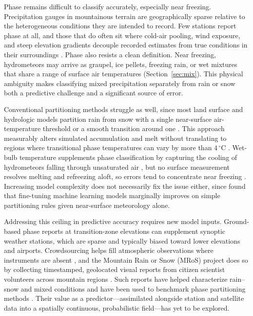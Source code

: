 \documentclass[twocol]{ametsocV6.1} %
\newcommand{\degC}[1]{\ensuremath{#1\,^{\circ}\mathrm{C}}}
\begin{document}
Phase remains difficult to classify accurately, especially near freezing.
Precipitation gauges in mountainous terrain are geographically sparse
relative to the heterogeneous conditions they are intended to record.
Few stations report phase at all, and those that do often sit where
cold-air pooling, wind exposure, and steep elevation gradients decouple
recorded estimates from true conditions in their surroundings
\citep{lundquist2008rain, minder2011, wayand2016}. Phase also resists a
clean definition. Near freezing, hydrometeors may arrive as graupel, ice
pellets, freezing rain, or wet mixtures that share a range of surface air
temperatures (Section~\ref{sec:mix}). This physical ambiguity makes
classifying mixed precipitation separately from rain or snow both a
predictive challenge and a significant source of error.

Conventional partitioning methods struggle as well, since most land
surface and hydrologic models partition rain from snow with a
single near-surface air-temperature threshold or a smooth transition
around one \citep{ding2014, dai2008}. This approach measurably alters simulated
accumulation and melt \citep{jennings2019sensitivity} without translating
to regions where transitional phase temperatures can vary by more than
\degC{4} \citep{jennings2018spatial}. Wet-bulb temperature supplements
phase classification by capturing the cooling of hydrometeors falling
through unsaturated air \citep{harder2013, sims2015, wang2019}, but no
surface measurement resolves melting and refreezing aloft, so errors tend to
concentrate near freezing \citep{feiccabrino2015}. Increasing model
complexity does not necessarily fix the issue either, since
\citet{jennings2025} found that fine-tuning machine learning models 
marginally improves on simple partitioning rules given near-surface
meteorology alone.

Addressing this ceiling in predictive accuracy requires new model
inputs. Ground-based phase reports at transition-zone elevations can
supplement synoptic weather stations, which are sparse and typically
biased toward lower elevations and airports. Crowdsourcing helps fill
atmospheric observations where instruments are absent
\citep{muller2015}, and the Mountain Rain or Snow (MRoS) project does so
by collecting timestamped, geolocated visual reports from citizen
scientist volunteers across mountain regions \citep{arienzo2021}. Such
reports have helped characterize rain--snow and mixed conditions and have
been used to benchmark phase partitioning methods
\citep{jennings2023mros,jennings2025}. Their value as a
predictor---assimilated alongside station and satellite data into a
spatially continuous, probabilistic field---has yet to be explored.
\end{document}
